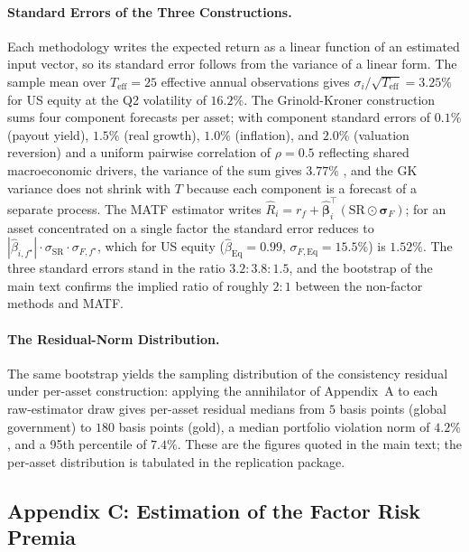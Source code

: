 \documentclass[pdftex,12pt,a4paper]{article}
\begin{document}
\paragraph*{Standard Errors of the Three Constructions.} Each methodology writes the expected return as a linear function of an estimated input vector, so its standard error follows from the variance of a linear form. The sample mean over $T_{\mathrm{eff}} = 25$ effective annual observations gives $\sigma_i/\sqrt{T_{\mathrm{eff}}} = 3.25\%$ for US equity at the Q2 volatility of $16.2\%$. The Grinold-Kroner construction sums four component forecasts per asset; with component standard errors of $0.1\%$ (payout yield), $1.5\%$ (real growth), $1.0\%$ (inflation), and $2.0\%$ (valuation reversion) and a uniform pairwise correlation of $\rho = 0.5$ reflecting shared macroeconomic drivers, the variance of the sum gives $3.77\%$ \citep{ChopraZiemba1993}, and the GK variance does not shrink with $T$ because each component is a forecast of a separate process. The MATF estimator writes $\hat R_i = r_f + \hat{\boldsymbol\beta}_i^{\intercal}(\mathrm{SR} \odot \boldsymbol\sigma_F)$; for an asset concentrated on a single factor the standard error reduces to $|\hat\beta_{i,f^\star}| \cdot \sigma_{\mathrm{SR}} \cdot \sigma_{F,f^\star}$, which for US equity ($\hat\beta_{\mathrm{Eq}} = 0.99$, $\sigma_{F,\mathrm{Eq}} = 15.5\%$) is $1.52\%$. The three standard errors stand in the ratio $3.2 : 3.8 : 1.5$, and the bootstrap of the main text confirms the implied ratio of roughly $2{:}1$ between the non-factor methods and MATF.

\paragraph*{The Residual-Norm Distribution.} The same bootstrap yields the sampling distribution of the consistency residual under per-asset construction: applying the annihilator of Appendix~A to each raw-estimator draw gives per-asset residual medians from $5$ basis points (global government) to $180$ basis points (gold), a median portfolio violation norm of $4.2\%$, and a 95th percentile of $7.4\%$. These are the figures quoted in the main text; the per-asset distribution is tabulated in the replication package.

\subsection*{Appendix C: Estimation of the Factor Risk Premia}\label{app:premia}
\end{document}
